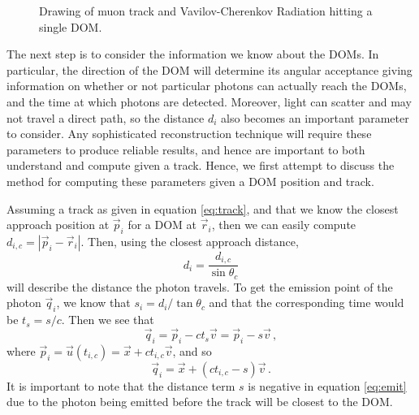 \begin{figure}
  \centering
  \caption{Drawing of muon track and Vavilov-Cherenkov Radiation hitting a single DOM.}
  \label{fig:ghit}
\end{figure}

The next step is to consider the information we know about the DOMs. In particular, the direction of the DOM will determine its angular acceptance giving information on whether or not particular photons can actually reach the DOMs, and the time at which photons are detected. Moreover, light can scatter and may not travel a direct path, so the distance $d_{i}$ also becomes an important parameter to consider. Any sophisticated reconstruction technique will require these parameters to produce reliable results, and hence are important to both understand and compute given a track. Hence, we first attempt to discuss the method for computing these parameters given a DOM position and track.

Assuming a track as given in equation \ref{eq:track}, and that we know the closest approach position at $\vec{p}_{i}$ for a DOM at $\vec{r}_{i}$, then we can easily compute $d_{i,c} = |\vec{p}_{i} - \vec{r}_{i}|$. Then, using the closest approach distance,
\begin{equation}\label{eq:dist}
  d_{i} = \frac{d_{i,c}}{\sin\theta_{c}}
\end{equation}
will describe the distance the photon travels. To get the emission point of the photon $\vec{q}_{i}$, we know that $s_{i} = d_{i}/\tan\theta_{c}$ and that the corresponding time would be $t_{s} = s/c$. Then we see that
\begin{equation}
  \vec{q}_{i} = \vec{p}_{i} - ct_{s}\vec{v} = \vec{p}_{i} - s\vec{v}\, ,
\end{equation}
where $\vec{p}_{i} = \vec{u}(t_{i,c}) = \vec{x} + ct_{i,c}\vec{v}$, and so
\begin{equation}\label{eq:emit}
  \vec{q}_{i} = \vec{x} + (ct_{i,c} - s)\vec{v}\, .
\end{equation}
It is important to note that the distance term $s$ is negative in equation \ref{eq:emit} due to the photon being emitted before the track will be closest to the DOM.

